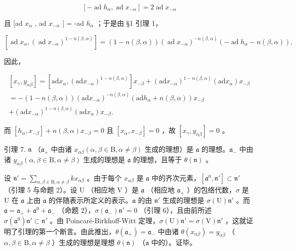 \[
[ - \operatorname{ad} h _ {\alpha}, \operatorname{ad} x _ {- \alpha} ] = 2 \operatorname{ad} x _ {- \alpha}
\]

且 {[}ad \(x_{\alpha}\) , ad \(x_{-\alpha}\) {]} = -ad \(h_{\alpha}\) ；于是由 §1 引理 1，

\[
[ \operatorname{ad} x _ {\alpha}, (\operatorname{ad} x _ {- \alpha}) ^ {1 - n (\beta , \alpha)} ] = (1 - n (\beta , \alpha)) (\operatorname{ad} x _ {- \alpha}) ^ {- n (\beta , \alpha)} (- \operatorname{ad} h _ {\alpha} - n (\beta , \alpha)).
\]

因此，

\[
\begin{array}{c} [ x _ {\gamma}, y _ {\alpha \beta} ] = [ \text {ad} x _ {\alpha}, (\text {ad} x _ {- \alpha}) ^ {1 - n (\beta , \alpha)} ] x _ {- \beta} + (\text {ad} x _ {- \alpha}) ^ {1 - n (\beta , \alpha)} (\text {ad} x _ {\alpha}) x _ {- \beta} \\ = - (1 - n (\beta , \alpha)) (\text {ad} x _ {- \alpha}) ^ {- n (\beta , \alpha)} (\text {ad} h _ {\alpha} + n (\beta , \alpha)) x _ {- \beta} \\ + (\text {ad} x _ {- \alpha}) ^ {1 - n (\beta , \alpha)} (\text {ad} x _ {\alpha}) x _ {- \beta}. \end{array}
\]

而 \([h_{\alpha},x_{-\beta}] + n(\beta ,\alpha)x_{-\beta} = 0\) 且 \([x_{\alpha},x_{-\beta}] = 0\) ，故 \([x_{\gamma},y_{\alpha \beta}] = 0\) 。

引理 7. \(\mathfrak{n}\) （\(\mathfrak{a}_{+}\) 中由诸 \(x_{\alpha \beta} (\alpha, \beta \in \mathrm{B}, \alpha \neq \beta)\) 生成的理想）是 \(\mathfrak{a}\) 的理想。\(\mathfrak{a}_{-}\) 中由诸 \(y_{\alpha \beta} (\alpha, \beta \in \mathrm{B}, \alpha \neq \beta)\) 生成的理想是 \(\mathfrak{a}\) 的理想，且等于 \(\theta(\mathfrak{n})\) 。

设 \(\mathfrak{n}' = \sum_{\alpha, \beta \in \mathrm{B}, \alpha \neq \beta} kx_{\alpha \beta}\) 。由于每个 \(x_{\alpha \beta}\) 是 \(\mathfrak{a}\) 中的齐次元素，\([\mathfrak{a}^0, \mathfrak{n}'] \subset \mathfrak{n}'\) （引理 5 与命题 2）。设 U （相应地 V ）是 \(\mathfrak{a}\) （相应地 \(\mathfrak{a}_+\) ）的包络代数，\(\sigma\) 是 U 在 \(\mathfrak{a}\) 上由 \(\mathfrak{a}\) 的伴随表示所定义的表示。\(\mathfrak{a}\) 的由 \(\mathfrak{n}'\) 生成的理想是 \(\sigma(\mathrm{U})\mathfrak{n}'\) 。而 \(\mathfrak{a} = \mathfrak{a}_+ + \mathfrak{a}^0 + \mathfrak{a}_-\) （命题 2），\(\sigma(\mathfrak{a}_-)\mathfrak{n}' = 0\) （引理 6），且由前所述 \(\sigma(\mathfrak{a}^0)\mathfrak{n}' \subset \mathfrak{n}'\) 。由 Poincaré-Birkhoff-Witt 定理，\(\sigma(\mathrm{U})\mathfrak{n}' = \sigma(\mathrm{V})\mathfrak{n}'\) ，这就证明了引理的第一个断言。由此推出，\(\theta(\mathfrak{a}_+) = \mathfrak{a}_-\) 中由诸 \(\theta(x_{\alpha \beta}) = y_{\alpha \beta}\) （ \(\alpha, \beta \in \mathrm{B}, \alpha \neq \beta\) ）生成的理想是理想 \(\theta(\mathfrak{n})\) （\(\mathfrak{a}\) 中的）。证毕。

